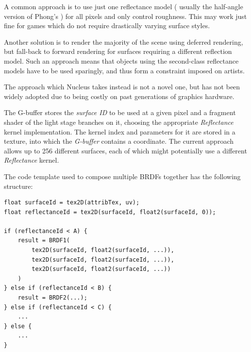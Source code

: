 A common approach is to use just one reflectance model ( usually the half-angle version of Phong's ) for all pixels and only control roughness. This may work just fine for games which do not require drastically varying surface styles.

Another solution is to render the majority of the scene using deferred rendering, but fall-back to forward rendering for surfaces requiring a different reflection model. Such an approach means that objects using the second-class reflectance models have to be used sparingly, and thus form a constraint imposed on artists.

The approach which Nucleus takes instead is not a novel one, but has not been widely adopted due to being costly on past generations of graphics hardware.

The G-buffer stores the \emph{surface ID} to be used at a given pixel and a fragment shader of the light stage branches on it, choosing the appropriate \emph{Reflectance} kernel implementation. The kernel index and parameters for it are stored in a texture, into which the \emph{G-buffer} contains a coordinate. The current approach allows up to 256 different surfaces, each of which might potentially use a different \emph{Reflectance} kernel.

The code template used to compose multiple BRDFs together has the following structure:

\noindent\begin{minipage}{\textwidth}
\begin{lstlisting}[frame=single]
float surfaceId = tex2D(attribTex, uv);
float reflectanceId = tex2D(surfaceId, float2(surfaceId, 0));
 
if (reflectanceId < A) {
    result = BRDF1(
        tex2D(surfaceId, float2(surfaceId, ...)),
        tex2D(surfaceId, float2(surfaceId, ...)),
        tex2D(surfaceId, float2(surfaceId, ...))
    )
} else if (reflectanceId < B) {
    result = BRDF2(...);
} else if (reflectanceId < C) {
    ...
} else {
    ...
}
\end{lstlisting}
\end{minipage}

